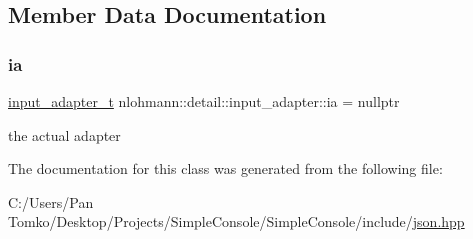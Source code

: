 \subsection{Member Data Documentation}
\mbox{\label{classnlohmann_1_1detail_1_1input__adapter_ad5a11d0b65b68f6950cfbe8c8366b7da}} 
\subsubsection{\texorpdfstring{ia}{ia}}
{\footnotesize\ttfamily \mbox{\hyperlink{namespacenlohmann_1_1detail_ae132f8cd5bb24c5e9b40ad0eafedf1c2}{input\+\_\+adapter\+\_\+t}} nlohmann\+::detail\+::input\+\_\+adapter\+::ia = nullptr\hspace{0.3cm}{\ttfamily [private]}}



the actual adapter 



The documentation for this class was generated from the following file\+:\begin{DoxyCompactItemize}
\item 
C\+:/\+Users/\+Pan Tomko/\+Desktop/\+Projects/\+Simple\+Console/\+Simple\+Console/include/\mbox{\hyperlink{json_8hpp}{json.\+hpp}}\end{DoxyCompactItemize}
